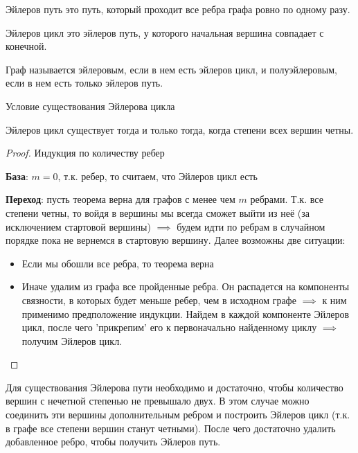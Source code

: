 
\begin{definition}
  Эйлеров путь это путь, который проходит все ребра графа ровно по одному разу.
\end{definition}

\begin{definition}
  Эйлеров цикл это эйлеров путь, у которого начальная вершина совпадает с
  конечной.
\end{definition}

\begin{definition}
  Граф называется эйлеровым, если в нем есть эйлеров цикл, и полуэйлеровым, если
  в нем есть только эйлеров путь.
\end{definition}

\begin{theorem}
  Условие существования Эйлерова цикла

  Эйлеров цикл существует тогда и только тогда, когда степени всех вершин четны.  
\end{theorem}
\begin{proof}
  Индукция по количеству ребер

  \textbf{База}: \(m = 0\), т.к. ребер, то считаем, что Эйлеров цикл есть

  \textbf{Переход}: пусть теорема верна для графов с менее чем \(m\) ребрами.
  Т.к. все степени четны, то войдя в вершины мы всегда сможет выйти из неё (за
  исключением стартовой вершины) \(\implies\) будем идти по ребрам в случайном
  порядке пока не вернемся в стартовую вершину. Далее возможны две ситуации:

  \begin{itemize}
    \item Если мы обошли все ребра, то теорема верна
    \item Иначе удалим из графа все пройденные ребра. Он распадется на
    компоненты связности, в которых будет меньше ребер, чем в исходном графе
    \(\implies\) к ним применимо предположение индукции. Найдем в каждой
    компоненте Эйлеров цикл, после чего 'прикрепим' его к первоначально
    найденному циклу \(\implies\) получим Эйлеров цикл.
  \end{itemize}
\end{proof}

\begin{remark}
  Для существования Эйлерова пути необходимо и достаточно, чтобы количество
  вершин с нечетной степенью не превышало двух. В этом случае можно соединить
  эти вершины дополнительным ребром и построить Эйлеров цикл (т.к. в графе все
  степени вершин станут четными). После чего достаточно удалить добавленное
  ребро, чтобы получить Эйлеров путь.
\end{remark}

